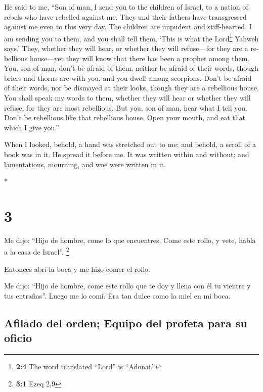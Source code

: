 \begin{paracol}{2}
\begin{otherlanguage}{english}
 He said to me, ``Son of man, I send you to the children
of Israel, to a nation of rebels who have rebelled against me. They and
their fathers have transgressed against me even to this very day.
 The children are impudent and stiff-hearted. I am sending
you to them, and you shall tell them, `This is what the Lord\footnote{\textbf{2:4}
  The word translated ``Lord'' is ``Adonai.''} Yahweh says.'
 They, whether they will hear, or whether they will
refuse---for they are a rebellious house---yet they will know that there
has been a prophet among them.  You, son of man, don't be
afraid of them, neither be afraid of their words, though briers and
thorns are with you, and you dwell among scorpions. Don't be afraid of
their words, nor be dismayed at their looks, though they are a
rebellious house.  You shall speak my words to them,
whether they will hear or whether they will refuse; for they are most
rebellious.  But you, son of man, hear what I tell you.
Don't be rebellious like that rebellious house. Open your mouth, and eat
that which I give you.''

 When I looked, behold, a hand was stretched out to me;
and behold, a scroll of a book was in it.  He spread it
before me. It was written within and without; and lamentations,
mourning, and woe were written in it.

\end{otherlanguage}

\switchcolumn[0]*

\hypertarget{section-4}{%
\section{3}\label{section-4}}

 Me dijo: ``Hijo de hombre, come lo que encuentres. Come
este rollo, y vete, habla a la casa de Israel''. \footnote{\textbf{3:1}
  Ezeq 2,9}

 Entonces abrí la boca y me hizo comer el rollo.

 Me dijo: ``Hijo de hombre, come este rollo que te doy y
llena con él tu vientre y tus entrañas''. Luego me lo comí. Era tan
dulce como la miel en mi boca.

\hypertarget{afilado-del-orden-equipo-del-profeta-para-su-oficio}{%
\subsection{Afilado del orden; Equipo del profeta para su
oficio}\label{afilado-del-orden-equipo-del-profeta-para-su-oficio}}


\end{paracol}
